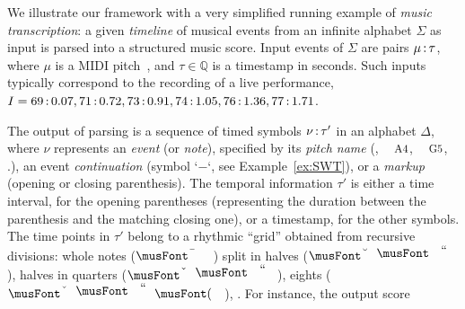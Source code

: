 \begin{example}%
\label{ex:running}
We illustrate our framework with a very simplified %
running example of \emph{music transcription}:
a given \emph{timeline} of musical events
from an infinite alphabet $\Sigma$ as input
is parsed into a structured music score.
Input events of $\Sigma$
are pairs $\mu \mathop{:}{\tau}$, where $\mu$ is a
MIDI pitch~\cite{Selfridge-Field97beyondMIDI}, %
and $\tau \in \mathbb{Q}$ is a timestamp in seconds.
Such inputs typically correspond
to the recording of a live performance, \eg
$I = 69\mathop{:}{0.07},
     71\mathop{:}{0.72},
     73\mathop{:}{0.91},
     74\mathop{:}{1.05},
     76\mathop{:}{1.36},
     77\mathop{:}{1.71}$. %

The output of parsing is a sequence of
timed symbols $\nu\mathop{:}{\tau'}$ in an alphabet $\Delta$,
where $\nu$  represents
an \emph{event} (or \emph{note}),
specified by its \emph{pitch name}
(\eg, $\mbox{\footnotesize A4}$, $\mbox{\footnotesize G5}$, \etc.),
an event \emph{continuation} (symbol `$-$`, see Example~\ref{ex:SWT}),
or a \emph{markup} (opening or closing parenthesis). %
The temporal information $\tau'$ 
is either a time interval, for the opening parentheses
(representing the duration between the parenthesis 
 and the matching closing one), 
or a timestamp, for the other symbols.
The time points in $\tau'$ belong to a rhythmic ``grid'' obtained from recursive divisions:
whole notes ($\musWhole$) split in halves ($\musHalf$), halves
in quarters ($\musQuarter$), eights ($\musEighth$), \etc.
%
For instance, the output score

\end{example}
